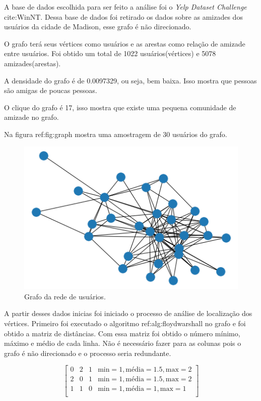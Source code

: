 \documentclass[11pt]{article}
\begin{document}
A base de dados escolhida para ser feito a análise foi o \emph{Yelp Dataset Challenge} cite:WinNT. Dessa base de dados foi retirado os dados sobre as amizades dos usuários da cidade de Madison, esse grafo é não direcionado.

O grafo terá seus vértices como usuários e as arestas como relação de amizade entre usuários. Foi obtido um total de 1022 usuários(vértices) e 5078 amizades(arestas).

A densidade do grafo é de 0.0097329, ou seja, bem baixa. Isso mostra que pessoas são amigas de poucas pessoas.

O clique do grafo é 17, isso mostra que existe uma pequena comunidade de amizade no grafo.

Na figura ref:fig:graph mostra uma amostragem de 30 usuários do grafo.

\begin{figure}[htbp]
\centering
\includegraphics[width=.9\linewidth]{../graph.png}
\caption{\label{fig:graph}
Grafo da rede de usuários.}
\end{figure}

A partir desses dados inicias foi iniciado o processo de análise de localização dos vértices. Primeiro foi executado o algoritmo ref:alg:floydwarshall no grafo e foi obtido a matriz de distâncias.
Com essa matriz foi obtido o número mínimo, máximo e médio de cada linha. Não é necessário fazer para as colunas pois o grafo é não direcionado e o processo seria redundante.

\begin{equation}
\begin{bmatrix}
 0 & 2 & 1 & \text{min}=1,\text{média}=1.5,\text{max}=2 \\
 2 & 0 & 1 & \text{min}=1,\text{média}=1.5,\text{max}=2 \\
 1 & 1 & 0 & \text{min}=1,\text{média}=1,\text{max}=1 \\
\end{bmatrix}
\end{equation}
\end{document}
